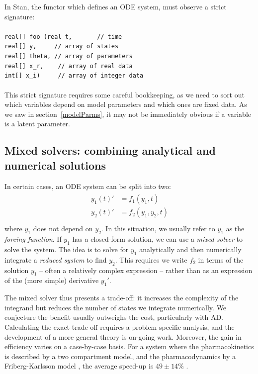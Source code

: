 \documentclass[11pt]{article}
\begin{document}
In Stan, the functor which defines an ODE system, must observe a strict signature: \\ \\
% 
\texttt{real[] foo (real t,  {\ \ \ \ \ \ \color{gray}// time} \\
\phantom{real[] foo (}real[] y, {\ \ \ \ \color{gray}// array of states} \\
\phantom{real[] foo (}real[] theta, {\color{gray}// array of parameters} \\
\phantom{real[] foo (}real[] x\_r, {\ \  \color{gray} // array of real data} \\
\phantom{real[] foo (}int[] x\_i) {\ \ \ \color{gray} // array of integer data}
                   } \\ \\
%
This strict signature requires some careful bookkeeping, as we need to sort out which 
variables depend on model parameters and which ones are fixed data. 
As we saw in section~\ref{modelParms}, it
may not be immediately obvious if a variable is a latent parameter.

\subsection{Mixed solvers: combining analytical and numerical solutions}

In certain cases, an ODE system can be split into two:
%
\begin{eqnarray*}
  \begin{aligned}
  y_1(t)' &= f_1(y_1, t) \\
  y_2(t)' &= f_2(y_1, y_2, t) \\
  \end{aligned}
\end{eqnarray*}
%
where $y_1$ does \underline{not} depend on $y_2$. In this situation, we usually refer to $y_1$
as the \textit{forcing function}. If $y_1$ has a closed-form solution, we can use a \textit{mixed solver} 
to solve the system. The idea is to solve for $y_1$ analytically and then 
numerically integrate a \textit{reduced system} to find $y_2$. This requires we write $f_2$ in 
terms of the solution $y_1$ -- often a relatively complex expression -- rather than as an 
expression of the (more simple) derivative $y_1'$. 

The mixed solver thus presents a trade-off: it increases the complexity of the integrand 
but reduces the number of states we integrate numerically. We conjecture the benefit usually outweighs 
the cost, particularly with AD. 
Calculating the exact trade-off requires a problem specific analysis, and the development of a more
general theory is on-going work.
%
Moreover, the gain in efficiency varies on a case-by-case basis.
For a system where the pharmacokinetics is described by a two compartment model,
and the pharmacodynamics by a Friberg-Karlsson model \cite{Friberg:2002}, 
the average speed-up is $49 \pm 14 \%$  \cite{Margossian:2017b}.
\end{document}
